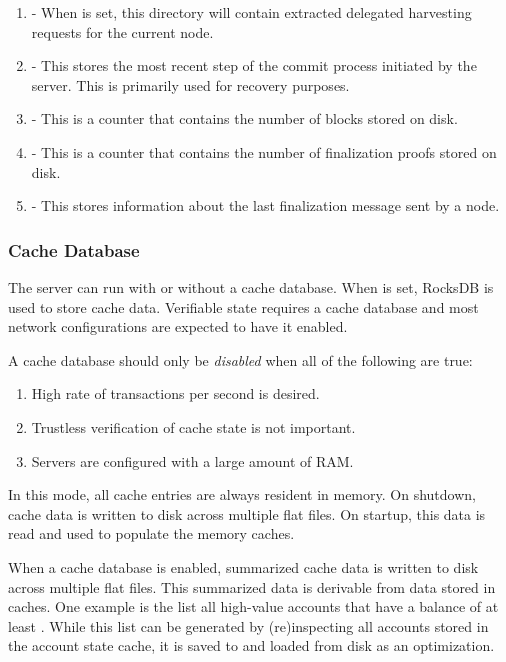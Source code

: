 \begin{enumerate}
	\item{ -
		When  is set, this directory will contain extracted delegated harvesting requests for the current node.
	}
	\item{ -
		This stores the most recent step of the commit process initiated by the server.
		This is primarily used for recovery purposes.
	}
	\item{ - This is a counter that contains the number of blocks stored on disk.}
	\item{ - This is a counter that contains the number of finalization proofs stored on disk.}
	\item{ - This stores information about the last finalization message sent by a node.}
\end{enumerate}

\subsubsection{Cache Database}

The server can run with or without a cache database.
When  is set, RocksDB is used to store cache data.
Verifiable state  requires a cache database and most network configurations are expected to have it enabled.

A cache database should only be \emph{disabled} when all of the following are true:

\begin{enumerate}
	\item{High rate of transactions per second is desired.}
	\item{Trustless verification of cache state is not important.}
	\item{Servers are configured with a large amount of RAM.}
\end{enumerate}

In this mode, all cache entries are always resident in memory.
On shutdown, cache data is written to disk across multiple flat files.
On startup, this data is read and used to populate the memory caches.

When a cache database is enabled, summarized cache data is written to disk across multiple flat files.
This summarized data is derivable from data stored in caches.
One example is the list all high-value accounts that have a balance of at least .
While this list can be generated by (re)inspecting all accounts stored in the account state cache, it is saved to and loaded from disk as an optimization.

